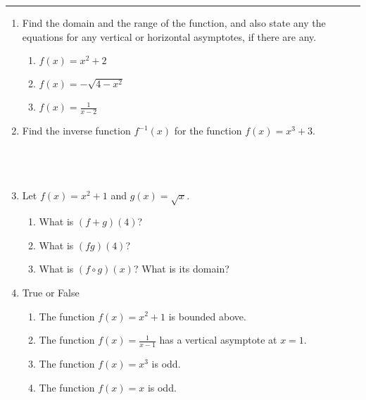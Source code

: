 \documentclass[11pt]{article}
\begin{document}
\Large


\medskip\hrule
\vspace{10pt}

\begin{enumerate}

\item Find the domain and the range of the function, and also state any the equations for any vertical or horizontal asymptotes, if there are any.
\begin{enumerate}
    \item $f(x) = x^2 + 2$
    \item $f(x) = -\sqrt{4-x^2}$ \\
    \item $f(x) = \frac{1}{x-2}$ \\
\end{enumerate}

\item Find the inverse function $f^{-1}(x)$ for the function $f(x) = x^3 + 3$. \\
\\
\\
\\

\item Let $f(x)=x^2 + 1$ and $g(x)=\sqrt{x}$.
\begin{enumerate}
    \item What is $(f+g)(4)$? \\
    \item What is $(fg)(4)$? \\
    \item What is $(f \circ g)(x)$? What is its domain? \\
\end{enumerate}

\item True or False
\begin{enumerate}
    \item The function $f(x)=x^2 + 1$ is bounded above. \\
    \item The function $f(x)=\frac{1}{x-1}$ has a vertical asymptote at $x=1$. \\
    \item The function $f(x)=x^3$ is odd. \\
    \item The function $f(x)=x$ is odd. \\
\end{enumerate}



\end{enumerate}
\end{document}
